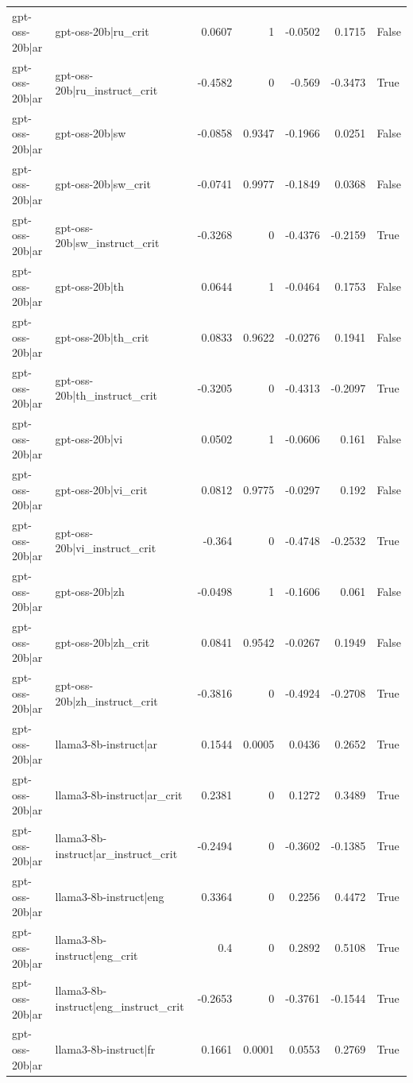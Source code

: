 \begin{table}
\begin{tabular}{l l r r r r l}
gpt-oss-20b|ar & gpt-oss-20b|ru_crit & 0.0607 & 1 & -0.0502 & 0.1715 & False \\
gpt-oss-20b|ar & gpt-oss-20b|ru_instruct_crit & -0.4582 & 0 & -0.569 & -0.3473 & True \\
gpt-oss-20b|ar & gpt-oss-20b|sw & -0.0858 & 0.9347 & -0.1966 & 0.0251 & False \\
gpt-oss-20b|ar & gpt-oss-20b|sw_crit & -0.0741 & 0.9977 & -0.1849 & 0.0368 & False \\
gpt-oss-20b|ar & gpt-oss-20b|sw_instruct_crit & -0.3268 & 0 & -0.4376 & -0.2159 & True \\
gpt-oss-20b|ar & gpt-oss-20b|th & 0.0644 & 1 & -0.0464 & 0.1753 & False \\
gpt-oss-20b|ar & gpt-oss-20b|th_crit & 0.0833 & 0.9622 & -0.0276 & 0.1941 & False \\
gpt-oss-20b|ar & gpt-oss-20b|th_instruct_crit & -0.3205 & 0 & -0.4313 & -0.2097 & True \\
gpt-oss-20b|ar & gpt-oss-20b|vi & 0.0502 & 1 & -0.0606 & 0.161 & False \\
gpt-oss-20b|ar & gpt-oss-20b|vi_crit & 0.0812 & 0.9775 & -0.0297 & 0.192 & False \\
gpt-oss-20b|ar & gpt-oss-20b|vi_instruct_crit & -0.364 & 0 & -0.4748 & -0.2532 & True \\
gpt-oss-20b|ar & gpt-oss-20b|zh & -0.0498 & 1 & -0.1606 & 0.061 & False \\
gpt-oss-20b|ar & gpt-oss-20b|zh_crit & 0.0841 & 0.9542 & -0.0267 & 0.1949 & False \\
gpt-oss-20b|ar & gpt-oss-20b|zh_instruct_crit & -0.3816 & 0 & -0.4924 & -0.2708 & True \\
gpt-oss-20b|ar & llama3-8b-instruct|ar & 0.1544 & 0.0005 & 0.0436 & 0.2652 & True \\
gpt-oss-20b|ar & llama3-8b-instruct|ar_crit & 0.2381 & 0 & 0.1272 & 0.3489 & True \\
gpt-oss-20b|ar & llama3-8b-instruct|ar_instruct_crit & -0.2494 & 0 & -0.3602 & -0.1385 & True \\
gpt-oss-20b|ar & llama3-8b-instruct|eng & 0.3364 & 0 & 0.2256 & 0.4472 & True \\
gpt-oss-20b|ar & llama3-8b-instruct|eng_crit & 0.4 & 0 & 0.2892 & 0.5108 & True \\
gpt-oss-20b|ar & llama3-8b-instruct|eng_instruct_crit & -0.2653 & 0 & -0.3761 & -0.1544 & True \\
gpt-oss-20b|ar & llama3-8b-instruct|fr & 0.1661 & 0.0001 & 0.0553 & 0.2769 & True \\

\end{tabular}
\end{table}
